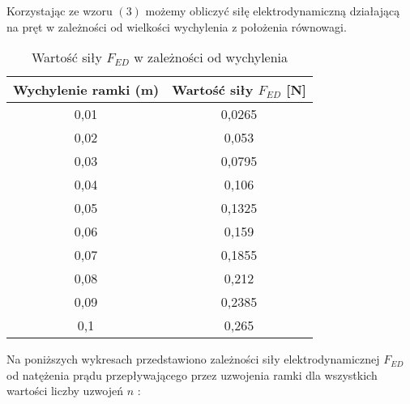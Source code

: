 \documentclass[10pt,a4paper]{article}
\newcommand{\forceindent}{\leavevmode{\parindent=3em\indent}}
\begin{document}
\forceindent Korzystając ze wzoru $(3)$ możemy obliczyć siłę elektrodynamiczną działającą na pręt w zależności od wielkości wychylenia z położenia równowagi.

\begin{table}[!h]
\centering
\begin{tabular}{|c|c|}
\hline
Wychylenie ramki (m) & Wartość siły $F_{ED}$ [N]\\
\hline
0,01&0,0265\\ 
 \hline 
0,02&0,053\\ 
 \hline 
0,03&0,0795\\ 
 \hline 
0,04&0,106\\ 
 \hline 
0,05&0,1325\\ 
 \hline 
0,06&0,159\\ 
 \hline 
0,07&0,1855\\ 
 \hline 
0,08&0,212\\ 
 \hline 
0,09&0,2385\\ 
 \hline 
0,1&0,265\\ 
 \hline 
\end{tabular}
\caption{Wartość siły $F_{ED}$ w zależności od wychylenia}
\end{table}
\newpage

\forceindent Na poniższych wykresach przedstawiono zależności siły elektrodynamicznej $F_{ED}$ od natężenia prądu przepływającego przez uzwojenia ramki dla wszystkich wartości liczby uzwojeń $n$ :
\end{document}
